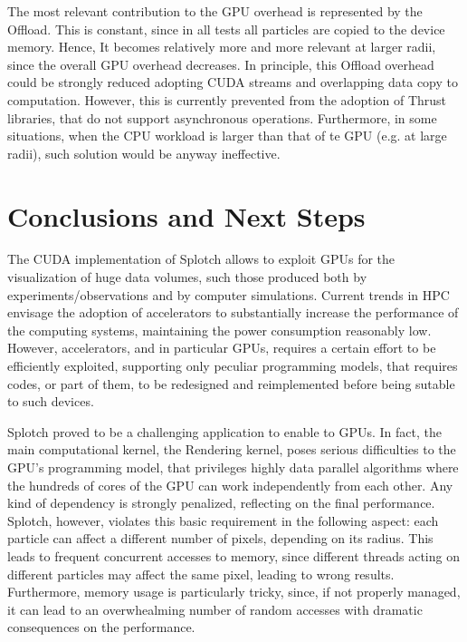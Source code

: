 \documentclass[11pt]{article}
\begin{document}
The most relevant contribution to the GPU overhead is represented by the 
Offload. This is constant, since in all tests all particles are copied 
to the device memory. Hence, It becomes relatively more and more relevant at larger
radii, since the overall GPU overhead decreases. In principle, this Offload overhead could
be strongly reduced adopting CUDA streams and overlapping data copy to 
computation. However, this is currently prevented from the adoption of
Thrust libraries, that do not support asynchronous operations. Furthermore,
in some situations, when the CPU workload is larger than that of
te GPU (e.g. at large radii), such solution would be anyway ineffective.  

\section{Conclusions and Next Steps}
\label{sec:conclusions}

The CUDA implementation of Splotch allows to exploit GPUs 
for the visualization of huge data volumes, such those produced both 
by experiments/observations and by computer simulations. Current trends
in HPC envisage the adoption of accelerators to substantially 
increase the performance of the computing systems, maintaining the power
consumption reasonably low. However, accelerators, and in particular 
GPUs, requires a certain effort to be efficiently exploited, 
supporting only peculiar programming models, that requires codes, or part
of them, to be redesigned and reimplemented before being sutable to such devices. 

Splotch proved to be a challenging application to enable to GPUs. 
In fact, the main computational kernel, the Rendering kernel, poses serious difficulties
to the GPU's programming model, that privileges highly data parallel algorithms
where the hundreds of cores of the GPU can work independently from each other.
Any kind of dependency is strongly penalized, reflecting on the final performance.
Splotch, however, violates this basic requirement in the following aspect:
each particle can affect a different number of pixels, depending on its radius.
This leads to frequent concurrent accesses to memory, since
different threads acting on different particles may affect the same pixel,
leading to wrong results. Furthermore, memory usage is particularly 
tricky, since, if not properly managed, 
it can lead to an overwhealming number of random accesses 
with dramatic consequences on the performance.
\end{document}
